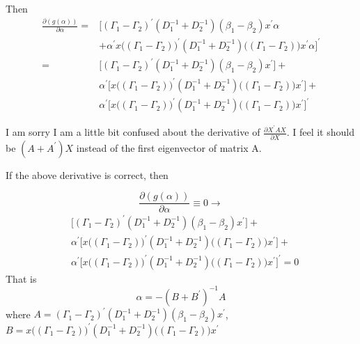 \documentclass[12pt]{article}
\begin{document}
Then 
$$ \begin{aligned}
\frac{\partial (g(\alpha))}{\partial \alpha} =&  \big[  (\Gamma_1 - \Gamma_2) ^{\prime}(D_1^{-1} + D_2^{-1}) (\beta_1 - \beta_2 )  x^{\prime}\alpha \\
&+ \alpha^{\prime} x \big((\Gamma_1 - \Gamma_2)  \big) ^{\prime}(D_1^{-1} + D_2^{-1}) \big((\Gamma_1 - \Gamma_2) \big)
x^{\prime}\alpha\big] ^{\prime} \\
=& \big[ (\Gamma_1 - \Gamma_2) ^{\prime}(D_1^{-1} + D_2^{-1}) (\beta_1 - \beta_2 )  x^{\prime}\big] + \\
& \alpha^{\prime}  \big[ x \big((\Gamma_1 - \Gamma_2)  \big) ^{\prime}(D_1^{-1} + D_2^{-1}) \big((\Gamma_1 - \Gamma_2) \big)
x^{\prime}\big]  + \\
& \alpha^{\prime}  \big[ x \big((\Gamma_1 - \Gamma_2)  \big) ^{\prime}(D_1^{-1} + D_2^{-1}) \big((\Gamma_1 - \Gamma_2) \big)
x^{\prime}\big]^{\prime} 
\end{aligned}$$

\noindent
I am sorry I am a little bit confused about the derivative of $\frac{\partial X^{\prime}A X}{\partial X}$. I feel it should be $(A + A^{\prime}) X$ instead of the first eigenvector of matrix A. 

\noindent
If the above derivative is correct, then 

$$\frac{\partial (g(\alpha))}{\partial \alpha} \equiv 0 \rightarrow $$
$$\begin{aligned}
&\big[ (\Gamma_1 - \Gamma_2) ^{\prime}(D_1^{-1} + D_2^{-1}) (\beta_1 - \beta_2 )  x^{\prime}\big] + \\
& \alpha^{\prime}  \big[ x \big((\Gamma_1 - \Gamma_2)  \big) ^{\prime}(D_1^{-1} + D_2^{-1}) \big((\Gamma_1 - \Gamma_2) \big)
x^{\prime}\big]  + \\
& \alpha^{\prime}  \big[ x \big((\Gamma_1 - \Gamma_2)  \big) ^{\prime}(D_1^{-1} + D_2^{-1}) \big((\Gamma_1 - \Gamma_2) \big)
x^{\prime}\big]^{\prime}  = 0
\end{aligned}$$
That is 
$$\alpha = -(B + B^{\prime})^{-1}A$$
where $A =(\Gamma_1 - \Gamma_2) ^{\prime}(D_1^{-1} + D_2^{-1}) (\beta_1 - \beta_2 )  x^{\prime}$, $B = x \big((\Gamma_1 - \Gamma_2)  \big) ^{\prime}(D_1^{-1} + D_2^{-1}) \big((\Gamma_1 - \Gamma_2) \big)
x^{\prime}$
\end{document}
